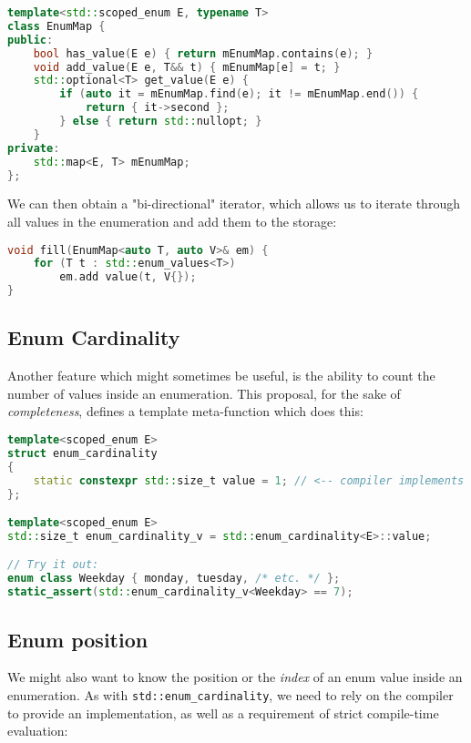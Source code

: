 \documentclass[
  format=manuscript,
  screen=true,
  review=false,
  nonacm=true,
  timestamp=true,
  balance=false]{acmart}
\begin{document}
\begin{lstlisting}[language=Cpp]
template<std::scoped_enum E, typename T>
class EnumMap {
public:
    bool has_value(E e) { return mEnumMap.contains(e); }
    void add_value(E e, T&& t) { mEnumMap[e] = t; }
    std::optional<T> get_value(E e) {
        if (auto it = mEnumMap.find(e); it != mEnumMap.end()) {
            return { it->second };
        } else { return std::nullopt; }
    }
private:
    std::map<E, T> mEnumMap;
};
\end{lstlisting}

We can then obtain a "bi-directional" iterator, which allows us to iterate through
all values in the enumeration and add them to the storage:\vspace{2mm}

\begin{lstlisting}[language=Cpp]
void fill(EnumMap<auto T, auto V>& em) {
    for (T t : std::enum_values<T>)
        em.add value(t, V{});
}
\end{lstlisting}


\subsection{Enum Cardinality}

Another feature which might sometimes be useful, is the ability to count the number
of values inside an enumeration. This proposal, for the sake of \textit{completeness},
defines a template meta-function which does this:\vspace{2mm}

\begin{lstlisting}[language=Cpp]
template<scoped_enum E>
struct enum_cardinality
{
    static constexpr std::size_t value = 1; // <-- compiler implements this
};

template<scoped_enum E>
std::size_t enum_cardinality_v = std::enum_cardinality<E>::value;

// Try it out:
enum class Weekday { monday, tuesday, /* etc. */ };
static_assert(std::enum_cardinality_v<Weekday> == 7);
\end{lstlisting}


\subsection{Enum position}

We might also want to know the position or the \textit{index} of an enum value
inside an enumeration. As with \texttt{std::enum\_cardinality}, we need to rely
on the compiler to provide an implementation, as well as a requirement of strict
compile-time evaluation:\vspace{2mm}
\end{document}

